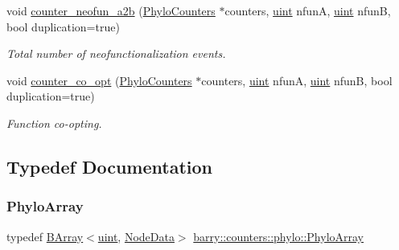 \begin{Indent}
\begin{DoxyCompactItemize}
void \hyperlink{namespacebarry_1_1counters_1_1phylo_a3394895262bbf1fd603193ef21b9ddb8}{counter\+\_\+neofun\+\_\+a2b} (\hyperlink{namespacebarry_1_1counters_1_1phylo_a4e401ffe66d04091343dcffaf915f8c3}{Phylo\+Counters} $\ast$counters, \hyperlink{namespacebarry_a11dfc53ddb4672278319aa04f1e09a6c}{uint} nfunA, \hyperlink{namespacebarry_a11dfc53ddb4672278319aa04f1e09a6c}{uint} nfunB, bool duplication=true)
\begin{DoxyCompactList}\small\item\em Total number of neofunctionalization events. \end{DoxyCompactList}\item 
void \hyperlink{namespacebarry_1_1counters_1_1phylo_adca76f02679f5f1bad46c9fa0ed68553}{counter\+\_\+co\+\_\+opt} (\hyperlink{namespacebarry_1_1counters_1_1phylo_a4e401ffe66d04091343dcffaf915f8c3}{Phylo\+Counters} $\ast$counters, \hyperlink{namespacebarry_a11dfc53ddb4672278319aa04f1e09a6c}{uint} nfunA, \hyperlink{namespacebarry_a11dfc53ddb4672278319aa04f1e09a6c}{uint} nfunB, bool duplication=true)
\begin{DoxyCompactList}\small\item\em Function co-\/opting. \end{DoxyCompactList}\end{DoxyCompactItemize}
\end{Indent}


\subsection{Typedef Documentation}
\mbox{\label{namespacebarry_1_1counters_1_1phylo_abd293bf65e494e903639fb5fb2c91604}} 
\subsubsection{\texorpdfstring{Phylo\+Array}{PhyloArray}}
{\footnotesize\ttfamily typedef \hyperlink{classbarry_1_1_b_array}{B\+Array}$<$\hyperlink{namespacebarry_a11dfc53ddb4672278319aa04f1e09a6c}{uint}, \hyperlink{classbarry_1_1counters_1_1phylo_1_1_node_data}{Node\+Data}$>$ \hyperlink{namespacebarry_1_1counters_1_1phylo_abd293bf65e494e903639fb5fb2c91604}{barry\+::counters\+::phylo\+::\+Phylo\+Array}}



